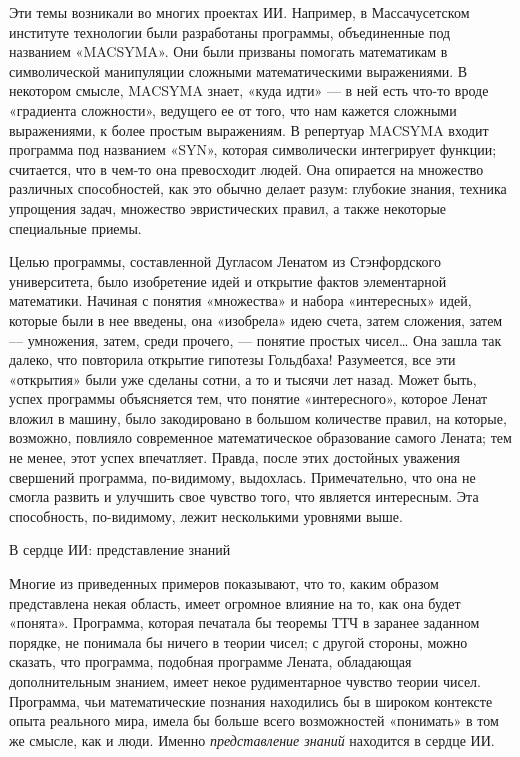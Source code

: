 Эти темы возникали во многих проектах ИИ. Например, в Массачусетском институте технологии были разработаны программы, объединенные под названием «MACSYMA». Они были призваны помогать математикам в символической манипуляции сложными математическими выражениями. В некотором смысле, MACSYMA знает, «куда идти» --- в ней есть что-то вроде «градиента сложности», ведущего ее от того, что нам кажется сложными выражениями, к более простым выражениям. В репертуар MACSYMA входит программа под названием «SYN», которая символически интегрирует функции; считается, что в чем-то она превосходит людей. Она опирается на множество различных способностей, как это обычно делает разум: глубокие знания, техника упрощения задач, множество эвристических правил, а также некоторые специальные приемы.

Целью программы, составленной Дугласом Ленатом из Стэнфордского университета, было изобретение идей и открытие фактов элементарной математики. Начиная с понятия «множества» и набора «интересных» идей, которые были в нее введены, она «изобрела» идею счета, затем сложения, затем --- умножения, затем, среди прочего, --- понятие простых чисел\ldots{} Она зашла так далеко, что повторила открытие гипотезы Гольдбаха! Разумеется, все эти «открытия» были уже сделаны сотни, а то и тысячи лет назад. Может быть, успех программы объясняется тем, что понятие «интересного», которое Ленат вложил в машину, было закодировано в большом количестве правил, на которые, возможно, повлияло современное математическое образование самого Лената; тем не менее, этот успех впечатляет. Правда, после этих достойных уважения свершений программа, по-видимому, выдохлась. Примечательно, что она не смогла развить и улучшить свое чувство того, что является интересным. Эта способность, по-видимому, лежит несколькими уровнями выше.

В сердце ИИ: представление знаний

Многие из приведенных примеров показывают, что то, каким образом представлена некая область, имеет огромное влияние на то, как она будет «понята». Программа, которая печатала бы теоремы ТТЧ в заранее заданном порядке, не понимала бы ничего в теории чисел; с другой стороны, можно сказать, что программа, подобная программе Лената, обладающая дополнительным знанием, имеет некое рудиментарное чувство теории чисел. Программа, чьи математические познания находились бы в широком контексте опыта реального мира, имела бы больше всего возможностей «понимать» в том же смысле, как и люди. Именно \emph{представление знаний} находится в сердце ИИ.


